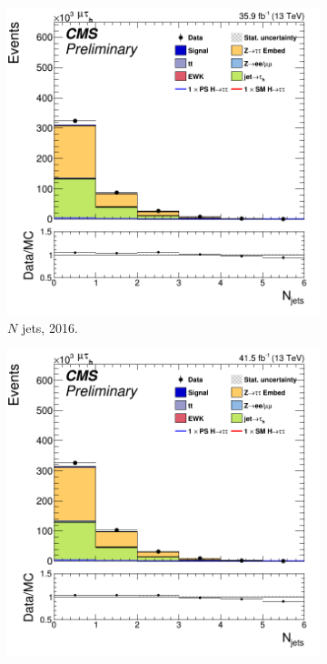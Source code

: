 \begin{figure}
  \begin{subfigure}[b]{0.33\linewidth}
    \centering
    \includegraphics[width=\linewidth]{Chapitre7/Images/CtrlPlots/2016/Njets.png} 
    \caption{$N$ jets, 2016.} 
    \vspace{0.5ex}
  \end{subfigure}%
  \begin{subfigure}[b]{0.33\linewidth}
    \centering
    \includegraphics[width=\linewidth]{Chapitre7/Images/CtrlPlots/2017/Njets.png} 

\end{subfigure}
\end{figure}
